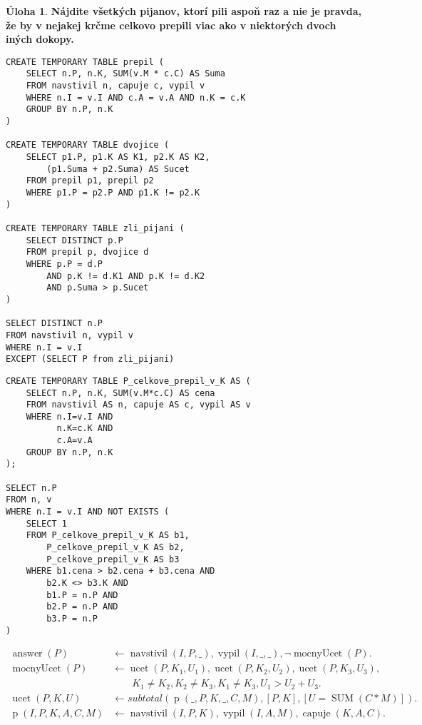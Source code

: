 \documentclass[10pt, a4paper]{article}
\theoremstyle{definition}
\newtheorem{problem}{Úloha}[section]
\DeclareMathOperator{\SUM}{\textrm{SUM}}
\DeclareMathOperator{\capuje}{capuje}
\DeclareMathOperator{\navstivil}{navstivil}
\DeclareMathOperator{\vypil}{vypil}
\DeclareMathOperator{\answer}{answer}
\begin{document}
\begin{problem}
{\bf Nájdite všetkých pijanov, ktorí pili aspoň raz a nie je pravda, že by v nejakej krčme celkovo prepili viac ako v niektorých dvoch iných dokopy.}\\[5mm]

\begin{minipage}[t]{0.49\textwidth}
\begin{verbatim}
CREATE TEMPORARY TABLE prepil (
    SELECT n.P, n.K, SUM(v.M * c.C) AS Suma
    FROM navstivil n, capuje c, vypil v
    WHERE n.I = v.I AND c.A = v.A AND n.K = c.K
    GROUP BY n.P, n.K
)

CREATE TEMPORARY TABLE dvojice (
    SELECT p1.P, p1.K AS K1, p2.K AS K2,
        (p1.Suma + p2.Suma) AS Sucet
    FROM prepil p1, prepil p2
    WHERE p1.P = p2.P AND p1.K != p2.K
)

CREATE TEMPORARY TABLE zli_pijani (
    SELECT DISTINCT p.P
    FROM prepil p, dvojice d
    WHERE p.P = d.P 
        AND p.K != d.K1 AND p.K != d.K2
        AND p.Suma > p.Sucet
)

SELECT DISTINCT n.P
FROM navstivil n, vypil v
WHERE n.I = v.I
EXCEPT (SELECT P from zli_pijani)
\end{verbatim}
\end{minipage}
\begin{minipage}[t]{0.49\textwidth}
\begin{verbatim}
CREATE TEMPORARY TABLE P_celkove_prepil_v_K AS (
    SELECT n.P, n.K, SUM(v.M*c.C) AS cena 
    FROM navstivil AS n, capuje AS c, vypil AS v
    WHERE n.I=v.I AND 
          n.K=c.K AND 
          c.A=v.A
    GROUP BY n.P, n.K
);

SELECT n.P
FROM n, v
WHERE n.I = v.I AND NOT EXISTS (
    SELECT 1
    FROM P_celkove_prepil_v_K AS b1,
        P_celkove_prepil_v_K AS b2,
        P_celkove_prepil_v_K AS b3
    WHERE b1.cena > b2.cena + b3.cena AND
        b2.K <> b3.K AND
        b1.P = n.P AND
        b2.P = n.P AND
        b3.P = n.P
)
\end{verbatim}
\end{minipage}

\begin{align*}
\answer(P) &\leftarrow \navstivil(I,P,\_), \vypil(I,\_,\_), \lnot \operatorname{mocnyUcet}(P).\\
\operatorname{mocnyUcet}(P) &\leftarrow \operatorname{ucet}(P,K_1,U_1), \operatorname{ucet}(P,K_2,U_2), \operatorname{ucet}(P,K_3,U_3),\\
 & \qquad K_1\neq K_2, K_2\neq K_3, K_1\neq K_3, U_1 > U_2 + U_3.\\
\operatorname{ucet}(P,K,U) &\leftarrow subtotal(\operatorname{p}(\_,P,K,\_,C,M), [P,K], [U=\SUM(C*M)]).\\
\operatorname{p}(I,P,K,A,C,M) &\leftarrow \navstivil(I,P,K), \vypil(I,A,M), \capuje(K,A,C).\\
\end{align*}
\end{problem}
\end{document}
